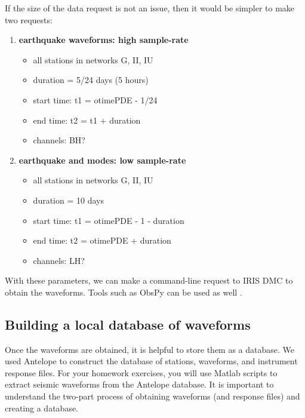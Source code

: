 \documentclass[11pt,titlepage,fleqn]{article}
\begin{document}
If the size of the data request is not an issue, then it would be simpler to make two requests:
%
\begin{enumerate}
\item {\bf earthquake waveforms: high sample-rate}

\begin{itemize}
\item all stations in networks G, II, IU
\item duration = 5/24 days (5 hours)
\item start time: t1 = otimePDE - 1/24
\item end time: t2 = t1 + duration
\item channels: BH?
\end{itemize}

\item {\bf earthquake and modes: low sample-rate}
\begin{itemize}
\item all stations in networks G, II, IU
\item duration = 10 days
\item start time: t1 = otimePDE - 1 - duration
\item end time: t2 = otimePDE + duration
\item channels: LH?
\end{itemize}

\end{enumerate}

With these parameters, we can make a command-line request to IRIS DMC to obtain the waveforms. Tools such as ObsPy can be used as well \citep{obspy2010,obspy2011}.


\subsection{Building a local database of waveforms}

Once the waveforms are obtained, it is helpful to store them as a database. We used Antelope to construct the database of stations, waveforms, and instrument response files. For your homework exercises, you will use Matlab scripts to extract seismic waveforms from the Antelope database. It is important to understand the two-part process of obtaining waveforms (and response files) and creating a database.

\fi



\end{document}
